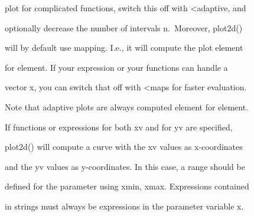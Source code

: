\documentclass[
]{book}
\begin{document}
plot for complicated functions, switch this off with \textless adaptive, and

optionally decrease the number of intervals n.~Moreover, plot2d()

will by default use mapping. I.e., it will compute the plot element

for element. If your expression or your functions can handle a

vector x, you can switch that off with \textless maps for faster evaluation.

Note that adaptive plots are always computed element for element.

If functions or expressions for both xv and for yv are specified,

plot2d() will compute a curve with the xv values as x-coordinates

and the yv values as y-coordinates. In this case, a range should be

defined for the parameter using xmin, xmax. Expressions contained

in strings must always be expressions in the parameter variable x.

\backmatter
\end{document}
